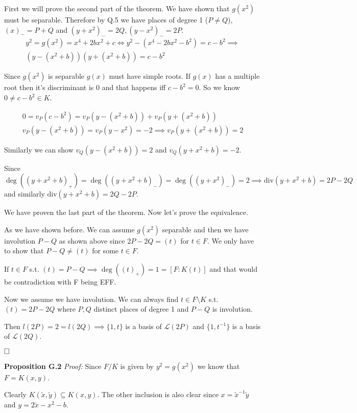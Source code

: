 \documentclass[12pt, a4paper]{article}
\newcommand{\qed}{\hfill\square}
\begin{document}
First we will prove the second part of the theorem. We have shown that $g(x^2)$ must be separable. Therefore by Q.5 we have places of degree 1 ($P\neq Q$), $(x)_{-} = P+Q$ and $(y+x^2)_{-}=2Q, (y-x^2)_{-} = 2P$.
\begin{gather*}
y^2=g(x^2) = x^4+2bx^2+c \iff y^2-(x^4-2bx^2-b^2) = c - b^2 \implies \\
(y-(x^2+b))(y+(x^2+b))=c-b^2
\end{gather*}

Since $g(x^2)$ is separable $g(x)$ must have simple roots. If $g(x)$ has a multiple root then it's discriminant is 0 and that happens iff $c-b^2=0$. So we know $0 \neq c-b^2 \in K$.

\begin{gather*}
0=v_P(c-b^2)=v_P(y-(x^2+b)) + v_P(y+(x^2+b))\\
v_P(y-(x^2+b)) = v_P(y-x^2) = -2 \implies v_P(y+(x^2+b)) = 2
\end{gather*}

Similarly we can show $v_Q(y-(x^2+b)) = 2$ and $v_Q(y+x^2+b)=-2$. 

Since $\deg((y+x^2+b)_{+}) = \deg((y+x^2+b)_{-}) = \deg((y+x^2)_{-}) = 2 \implies \text{div}(y+x^2+b) = 2P - 2Q$ and similarly $\text{div}(y+x^2+b) = 2Q - 2P$.

We have proven the last part of the theorem. Now let's prove the equivalence.

As we have shown before. We can assume $g(x^2)$ separable and then we have involution $P-Q$ as shown above since $2P-2Q = (t)$ for $t \in F$. We only have to show that $P-Q \neq (t)$ for some $t \in F$. 

If $t \in F$ s.t. $(t) = P - Q \implies \deg((t)_{+}) = 1 = [F:K(t)]$ and that would be contradiction with F being EFF.

Now we assume we have involution. We can always find $t \in F \setminus K$ s.t. $(t) = 2P-2Q$ where $P,Q$ distinct places of degree 1 and $P-Q$ is involution.

Then $l(2P) = 2 = l(2Q) \implies \{1,t\}$ is a basis of $\mathcal{L}(2P)$ and $\{1,t^{-1}\}$ is a basis of $\mathcal{L}(2Q)$.

$\qed$


\textbf{Proposition G.2} \textit{Proof:}
Since $F/K$ is given by $y^2 = g(x^2)$ we know that $F=K(x,y)$.

Clearly $K(\tilde{x},\tilde{y}) \subseteq K(x,y)$. The other inclusion is also clear since $x = \tilde{x}^{-1}\tilde{y}$ and $y = 2\tilde{x}-x^2-b$. 
\end{document}

